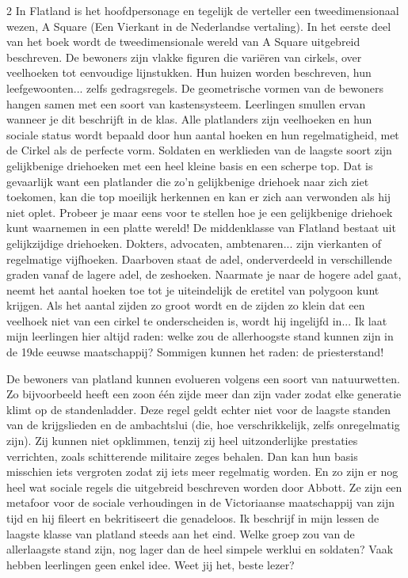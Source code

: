 \begin{multicols}{2}
In Flatland is het hoofdpersonage en tegelijk de verteller een tweedimensionaal wezen, A Square (Een Vierkant in de Nederlandse vertaling). In het eerste deel van het boek wordt de tweedimensionale wereld van A Square uitgebreid beschreven. De bewoners zijn vlakke figuren die variëren van cirkels, over veelhoeken tot eenvoudige lijnstukken. Hun huizen worden beschreven, hun leefgewoonten... zelfs gedragsregels. De geometrische vormen van de bewoners hangen samen met een soort van kastensysteem. Leerlingen smullen ervan wanneer je dit beschrijft in de klas. Alle platlanders zijn veelhoeken en hun sociale status wordt bepaald door hun aantal hoeken en hun regelmatigheid, met de Cirkel als de perfecte vorm. Soldaten en werklieden van de laagste soort zijn gelijkbenige driehoeken met een heel kleine basis en een scherpe top. Dat is gevaarlijk want een platlander die zo'n gelijkbenige driehoek naar zich ziet toekomen, kan die top moeilijk herkennen en kan er zich aan verwonden als hij niet oplet. Probeer je maar eens voor te stellen hoe je een gelijkbenige driehoek kunt waarnemen in een platte wereld!  De middenklasse van Flatland bestaat uit gelijkzijdige driehoeken. Dokters, advocaten, ambtenaren... zijn vierkanten of regelmatige vijfhoeken. Daarboven staat de adel, onderverdeeld in verschillende graden vanaf de lagere adel, de zeshoeken. Naarmate je naar de hogere adel gaat, neemt het aantal hoeken toe tot je uiteindelijk de eretitel van polygoon kunt krijgen. Als het aantal zijden zo groot wordt en de zijden zo klein dat een veelhoek niet van een cirkel te onderscheiden is, wordt hij ingelijfd in... Ik laat mijn leerlingen hier altijd raden: welke zou de allerhoogste stand kunnen zijn in de 19de eeuwse maatschappij? Sommigen kunnen het raden: de priesterstand!

De bewoners van platland kunnen evolueren volgens een soort van natuurwetten. Zo bijvoorbeeld heeft een zoon één zijde meer dan zijn vader zodat elke generatie klimt op de standenladder. Deze regel geldt echter niet voor de laagste standen van de krijgslieden en de ambachtslui (die, hoe verschrikkelijk, zelfs onregelmatig zijn). Zij kunnen niet opklimmen, tenzij zij heel uitzonderlijke prestaties verrichten, zoals schitterende militaire zeges behalen. Dan kan hun basis misschien iets vergroten zodat zij iets meer regelmatig worden. En zo zijn er nog heel wat sociale regels die uitgebreid beschreven worden door Abbott. Ze zijn een metafoor voor de sociale verhoudingen in de Victoriaanse maatschappij van zijn tijd en hij fileert en bekritiseert die genadeloos. Ik beschrijf in mijn lessen de  laagste klasse van platland steeds aan het eind. Welke groep zou van de allerlaagste stand zijn, nog lager dan de heel simpele werklui en soldaten? Vaak hebben leerlingen geen enkel idee. Weet jij het, beste lezer?

\end{multicols}
